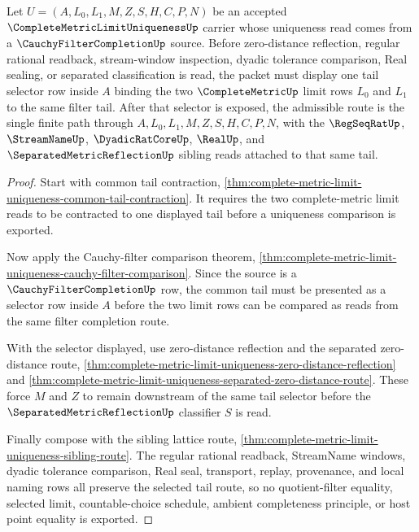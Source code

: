 \begin{theorem}
\label{thm:complete-metric-limit-uniqueness-filter-tail-selector-route}
Let $U=(A,L_{0},L_{1},M,Z,S,H,C,P,N)$ be an accepted $\CompleteMetricLimitUniquenessUp$ carrier whose uniqueness read comes from a $\CauchyFilterCompletionUp$ source. Before zero-distance reflection, regular rational readback, stream-window inspection, dyadic tolerance comparison, Real sealing, or separated classification is read, the packet must display one tail selector row inside $A$ binding the two $\CompleteMetricUp$ limit rows $L_{0}$ and $L_{1}$ to the same filter tail. After that selector is exposed, the admissible route is the single finite path through $A,L_{0},L_{1},M,Z,S,H,C,P,N$, with the $\RegSeqRatUp$, $\StreamNameUp$, $\DyadicRatCoreUp$, $\RealUp$, and $\SeparatedMetricReflectionUp$ sibling reads attached to that same tail.
\end{theorem}
\begin{proof}
Start with common tail contraction, \autoref{thm:complete-metric-limit-uniqueness-common-tail-contraction}. It requires the two complete-metric limit reads to be contracted to one displayed tail before a uniqueness comparison is exported.

Now apply the Cauchy-filter comparison theorem, \autoref{thm:complete-metric-limit-uniqueness-cauchy-filter-comparison}. Since the source is a $\CauchyFilterCompletionUp$ row, the common tail must be presented as a selector row inside $A$ before the two limit rows can be compared as reads from the same filter completion route.

With the selector displayed, use zero-distance reflection and the separated zero-distance route, \autoref{thm:complete-metric-limit-uniqueness-zero-distance-reflection} and \autoref{thm:complete-metric-limit-uniqueness-separated-zero-distance-route}. These force $M$ and $Z$ to remain downstream of the same tail selector before the $\SeparatedMetricReflectionUp$ classifier $S$ is read.

Finally compose with the sibling lattice route, \autoref{thm:complete-metric-limit-uniqueness-sibling-route}. The regular rational readback, StreamName windows, dyadic tolerance comparison, Real seal, transport, replay, provenance, and local naming rows all preserve the selected tail route, so no quotient-filter equality, selected limit, countable-choice schedule, ambient completeness principle, or host point equality is exported.
\end{proof}

